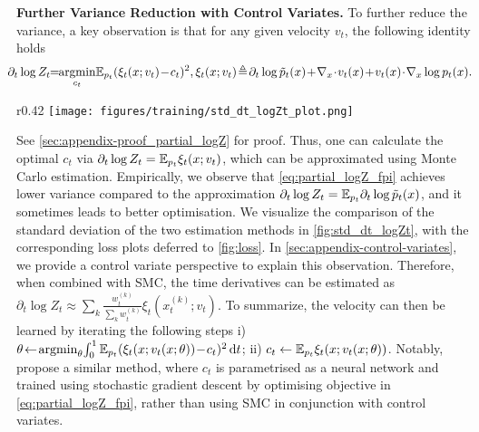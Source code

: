 \textbf{Further Variance Reduction with Control Variates.}
To further reduce the variance, a key observation is that for any given velocity $v_t$, the following identity holds
\begin{align} \label{eq:partial_logZ_fpi}
    \!\!\!\!\!\partial_t \log Z_t \!\!=\!\! \argmin_{c_t} \!\E_{p_t} (\xi_t(x;v_t) \!-\! c_t)^2, \xi_t(x;v_t) \!\triangleq\! \partial_t \log \tilde{p}_t (x) \!+\! \nabla_x \!\cdot\! v_t (x) \!+\! v_t (x) \!\cdot\! \nabla_x \log p_t (x).
\end{align}
\begin{wrapfigure}{r}{0.42\linewidth}
    \centering
    \vspace{-4mm}
    \texttt{[image: figures/training/std\_dt\_logZt\_plot.png]}
    \vspace{-2mm}
    \caption{Standard deviation of the estimation of $\partial_t \log Z_t$.}
    \label{fig:std_dt_logZt}
    \vspace{-4mm}
\end{wrapfigure}
See \cref{sec:appendix-proof_partial_logZ} for proof. Thus, one can calculate the optimal $c_t$ via $\partial_t \log Z_t = {\mathbb E}_{p_t} \xi_t (x;v_t)$, which can be approximated using Monte Carlo estimation. Empirically, we observe that \cref{eq:partial_logZ_fpi} achieves lower variance compared to the approximation $\partial_t \log Z_t = {\mathbb E}_{p_t} \partial_t \log \tilde{p}_t (x)$, and it sometimes leads to better optimisation. We visualize the comparison of the standard deviation of the two estimation methods in \cref{fig:std_dt_logZt}, with the corresponding loss plots deferred to \cref{fig:loss}.
In \cref{sec:appendix-control-variates}, we provide a control variate perspective to explain this observation. Therefore, when combined with SMC, the time derivatives can be estimated as $\partial_t \log Z_t \approx \sum_k \frac{w_t^{(k)}}{\sum_k w_t^{(k)}} \xi_t (x_t^{(k)}; v_t)$.
To summarize, the velocity can then be learned by iterating the following steps i) $\theta \!\leftarrow\! \operatorname*{argmin}_\theta \!\int_0^1 {\mathbb E}_{p_t} (\xi_t(x;v_t(x;\theta)) \!-\! c_t)^2 \mathop{}\!\mathrm{d} t$; ii) $c_t \leftarrow {\mathbb E}_{p_t} \xi_t (x; v_t(x;\theta))$. 
Notably, \cite{mate2023learning} propose a similar method, where $c_t$ is parametrised as a neural network and trained using stochastic gradient descent by optimising objective in \cref{eq:partial_logZ_fpi}, rather than using SMC in conjunction with control variates.


